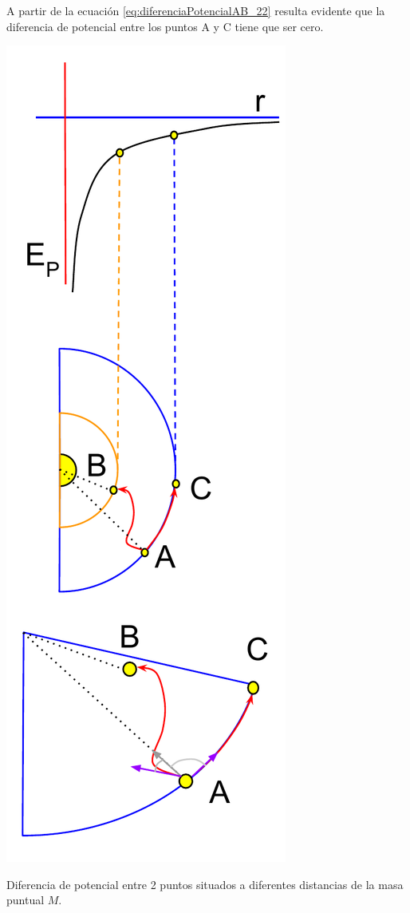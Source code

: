 A partir de la ecuaci\'on \ref{eq:diferenciaPotencialAB_22} resulta evidente que la diferencia de potencial entre los puntos A y C tiene que ser cero.


\begin{marginfigure}
  \includegraphics[width=\linewidth]{DiferenciaPotencialAB.pdf}
  \caption{Diferencia de potencial entre 2 puntos situados a diferentes distancias de la masa puntual $M$.}
  \label{fig:DiferenciaPotencialAB}
\end{marginfigure}
